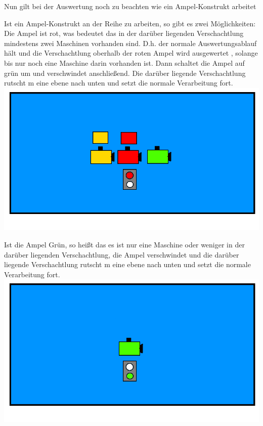 \documentclass{scrartcl}
\begin{document}
\begin{description}
			Nun gilt bei der Auswertung noch zu beachten wie ein Ampel-Konstrukt arbeitet\\
			
		\begin{minipage}{1\textwidth}
			Ist ein Ampel-Konstrukt an der Reihe zu arbeiten, so gibt es zwei Möglichkeiten:\\
			Die Ampel ist rot, was bedeutet das in der darüber liegenden Verschachtlung mindestens zwei Maschinen vorhanden sind. D.h. der normale Auswertungsablauf hält und die Verschachtlung oberhalb der roten Ampel wird ausgewertet , solange bis nur noch eine Maschine darin vorhanden ist. Dann schaltet die Ampel auf grün um und verschwindet anschließend. Die darüber liegende Verschachtlung rutscht m eine ebene nach unten und setzt die normale Verarbeitung fort.\\ 
			\includegraphics[scale=0.5]{assets/AuswertungAmpelRot}
		\end{minipage}
		
		\begin{minipage}{1\textwidth}
			Ist die Ampel Grün, so heißt das es ist nur eine Maschine oder weniger in der darüber liegenden Verschachtlung, die Ampel verschwindet und die darüber liegende Verschachtlung rutscht m eine ebene nach unten und setzt die normale Verarbeitung fort.\\  
			\includegraphics[scale=0.5]{assets/AsuwertungAmpelGrun}
		\end{minipage}


\end{description}
\end{document}

